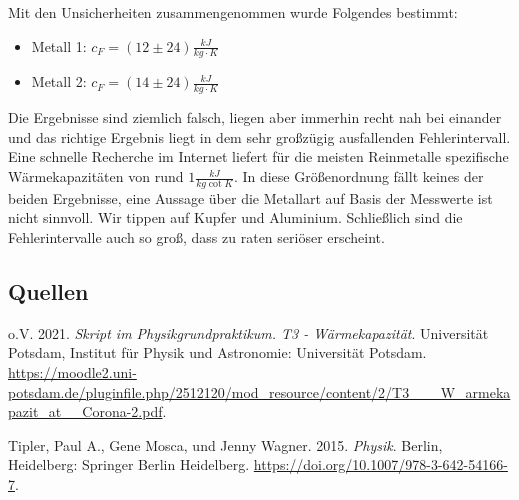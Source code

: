 \documentclass[
  9pt,
]{article}
\newlength{\cslhangindent}
\newlength{\cslentryspacingunit} %
\newenvironment{CSLReferences}[2] %
 {%
  \setlength{\parindent}{0pt}
  \ifodd #1
  \let\oldpar\par
  \def\par{\hangindent=\cslhangindent\oldpar}
  \fi
  \setlength{\parskip}{#2\cslentryspacingunit}
 }%
 {}
\begin{document}
Mit den Unsicherheiten zusammengenommen wurde Folgendes bestimmt:

\begin{itemize}
  \item Metall 1: $c_F = (12\pm 24)\frac{kJ}{kg\cdot K}$
  \item Metall 2: $c_F = (14\pm 24)\frac{kJ}{kg\cdot K}$
\end{itemize}

Die Ergebnisse sind ziemlich falsch, liegen aber immerhin recht nah bei
einander und das richtige Ergebnis liegt in dem sehr großzügig
ausfallenden Fehlerintervall. Eine schnelle Recherche im Internet
liefert für die meisten Reinmetalle spezifische Wärmekapazitäten von
rund \(1\frac{kJ}{kg\cot K}\). In diese Größenordnung fällt keines der
beiden Ergebnisse, eine Aussage über die Metallart auf Basis der
Messwerte ist nicht sinnvoll. Wir tippen auf Kupfer und Aluminium.
Schließlich sind die Fehlerintervalle auch so groß, dass zu raten
seriöser erscheint.

\hypertarget{quellen}{%
\subsection*{Quellen}\label{quellen}}

\hypertarget{refs}{}
\begin{CSLReferences}{1}{0}
\leavevmode{}%
o.V. 2021. \emph{Skript im Physikgrundpraktikum. T3 - Wärmekapazität}.
Universität Potsdam, Institut für Physik und Astronomie: {Universität
Potsdam}.
\url{https://moodle2.uni-potsdam.de/pluginfile.php/2512120/mod_resource/content/2/T3___W_armekapazit_at__Corona-2.pdf}.

\leavevmode{}%
Tipler, Paul A., Gene Mosca, und Jenny Wagner. 2015. \emph{Physik}.
Berlin, Heidelberg: {Springer Berlin Heidelberg}.
\url{https://doi.org/10.1007/978-3-642-54166-7}.

\end{CSLReferences}
\end{document}
